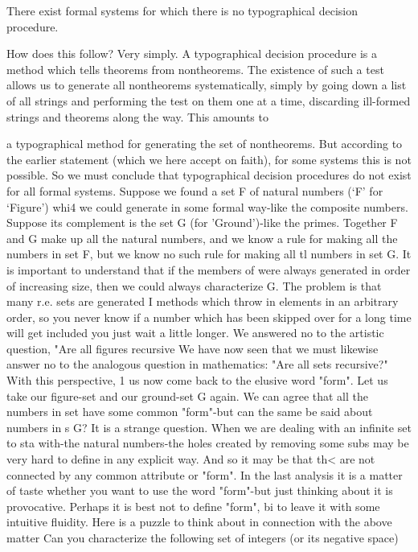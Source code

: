 There exist formal systems for which there is no typographical decision procedure. 

How does this follow? Very simply. A typographical decision procedure is a method which tells theorems from nontheorems. The existence of such a test allows us to generate all nontheorems systematically, simply by going down a list of all strings and performing the test on them one at a time, discarding ill-formed strings and theorems along the way. This amounts to 







a typographical method for generating the set of nontheorems. But according to the earlier statement (which we here accept on faith), for some systems this is not possible. So we must conclude that typographical decision procedures do not exist for all formal systems. Suppose we found a set F of natural numbers (`F' for `Figure') whi4 we could generate in some formal way-like the composite numbers. Suppose its complement is the set G (for 'Ground')-like the primes. Together F and G make up all the natural numbers, and we know a rule for making all the numbers in set F, but we know no such rule for making all tl numbers in set G. It is important to understand that if the members of were always generated in order of increasing size, then we could always characterize G. The problem is that many r.e. sets are generated I methods which throw in elements in an arbitrary order, so you never know if a number which has been skipped over for a long time will get included you just wait a little longer. We answered no to the artistic question, "Are all figures recursive We have now seen that we must likewise answer no to the analogous question in mathematics: "Are all sets recursive?" With this perspective, 1 us now come back to the elusive word "form". Let us take our figure-set and our ground-set G again. We can agree that all the numbers in set have some common "form"-but can the same be said about numbers in s G? It is a strange question. When we are dealing with an infinite set to sta with-the natural numbers-the holes created by removing some subs may be very hard to define in any explicit way. And so it may be that th< are not connected by any common attribute or "form". In the last analysis it is a matter of taste whether you want to use the word "form"-but just thinking about it is provocative. Perhaps it is best not to define "form", bi to leave it with some intuitive fluidity. Here is a puzzle to think about in connection with the above matter Can you characterize the following set of integers (or its negative space) 

